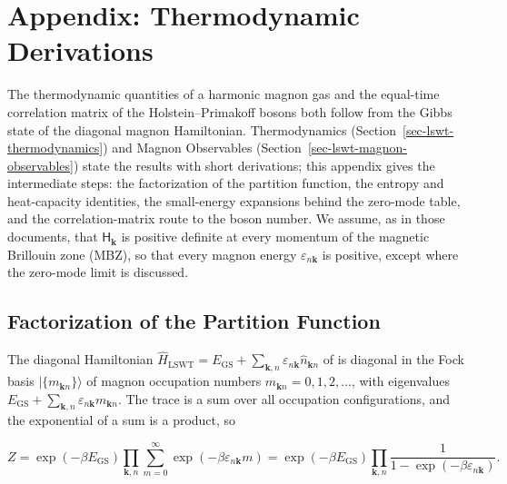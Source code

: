 
\hypertarget{sec-lswt-thermodynamic-derivations}{%
\section{Appendix: Thermodynamic Derivations}\label{sec-lswt-thermodynamic-derivations}}

The thermodynamic quantities of a harmonic magnon gas and the equal-time correlation matrix of the Holstein--Primakoff bosons both follow from the Gibbs state of the diagonal magnon Hamiltonian. Thermodynamics (Section~\ref{sec-lswt-thermodynamics}) and Magnon Observables (Section~\ref{sec-lswt-magnon-observables}) state the results with short derivations; this appendix gives the intermediate steps: the factorization of the partition function, the entropy and heat-capacity identities, the small-energy expansions behind the zero-mode table, and the correlation-matrix route to the boson number. We assume, as in those documents, that \(\mathsf H_{\mathbf k}\) is positive definite at every momentum of the magnetic Brillouin zone (MBZ), so that every magnon energy \(\varepsilon_{n\mathbf k}\) is positive, except where the zero-mode limit is discussed.

\subsection{Factorization of the Partition Function}

The diagonal Hamiltonian \(\hat H_{\mathrm{LSWT}}=E_{\mathrm{GS}}+\sum_{\mathbf k,n}\varepsilon_{n\mathbf k}\hat n_{\mathbf kn}\) of  is diagonal in the Fock basis \(|\{m_{\mathbf kn}\}\rangle\) of magnon occupation numbers \(m_{\mathbf kn}=0,1,2,\ldots\), with eigenvalues \(E_{\mathrm{GS}}+\sum_{\mathbf k,n}\varepsilon_{n\mathbf k}m_{\mathbf kn}\). The trace is a sum over all occupation configurations, and the exponential of a sum is a product, so

\[
Z=\exp(-\beta E_{\mathrm{GS}})\prod_{\mathbf k,n}\sum_{m=0}^{\infty}\exp(-\beta\varepsilon_{n\mathbf k}m)
=\exp(-\beta E_{\mathrm{GS}})\prod_{\mathbf k,n}\frac{1}{1-\exp(-\beta\varepsilon_{n\mathbf k})}.
\]

